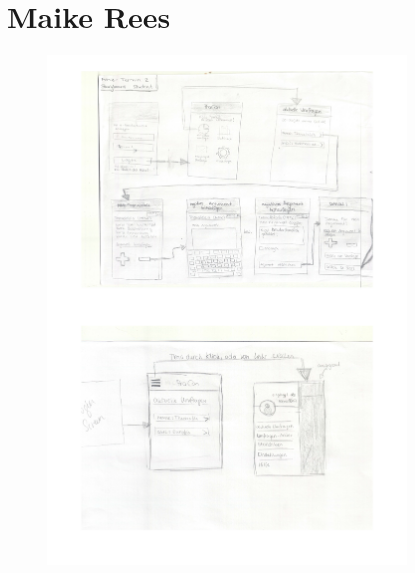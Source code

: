 \section{Maike Rees}
\label{sec:rees}

\begin{figure}
  \vspace{-20pt}
  \begin{center}
    \includegraphics[page=1,width=0.85\textwidth]{./images/entwuerfe/maike}
  \end{center}
  \vspace{-40pt}
\end{figure}



